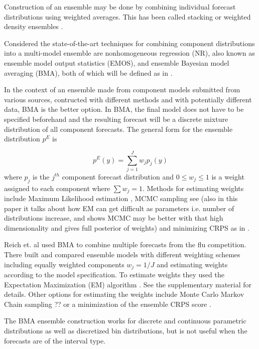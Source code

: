 \documentclass{article}\usepackage[]{graphicx}\usepackage[]{color}
\begin{document}
Construction of an ensemble may be done by combining individual forecast 
distributions using weighted averages. This has been called stacking 
\cite{wolpert1992stacked} or weighted density ensembles 
\cite{ray2018prediction}.

Considered the state-of-the-art techniques for combining component distributions
into a multi-model ensemble are nonhomogeneous regression (NR), also known as
ensemble model output statistics (EMOS), and ensemble Bayesian model averaging
(BMA), both of which will be defined as in \cite{gneiting2014probabilistic}.

In the context of an ensemble made from component models submitted from various
sources, contructed with different methods and with potentially different data,
BMA is the better option. In BMA, the final model does not have to be specified
beforehand and the resulting forecast will be a discrete mixture distribution
of all component forecasts. The general form for the ensemble distribution $p^E$
is

\begin{equation}
  p^E(y) = \sum_{j=1}^J w_jp_j(y)
\end{equation}
where $p_j$ is the $j^{th}$ component forecast distribution and 
$0 \leq w_j \leq 1$ is a weight assigned to each component where $\sum w_j = 1$.
Methods for estimating weights include Maximum Likelihood estimation
\cite{raftery2005using}, MCMC 
sampling see \cite{vrugt2008ensemble} (also in this paper it talks about how 
EM can get difficult as parameters i.e. number of distributions increase, and 
shows MCMC may be better with that high dimensionality and gives full posterior
of weights)
and minimizing CRPS as in 
\cite{baran2018combining}.

Reich et. al used BMA to combine multiple forecasts from the flu 
competition. There built and compared ensemble models with different weighting
schemes including equally weighted components $w_j = 1/J$ and estimating weights
according to the model specification. To estimate weights they used the 
Expectation Maximization (EM) algorithm \cite{reich2019accuracy}. See the
supplementary material for details. Other options for estimating the weights 
include Monte Carlo Markov Chain sampling ??\cite{vrugt2008ensemble} or a 
minimization of the ensemble CRPS score \cite{baran2018combining}.

The BMA ensemble construction works for discrete and continuous parametric 
distributions as well as discretized bin distributions, but is not useful when 
the forecasts are of the interval type. 
\end{document}
